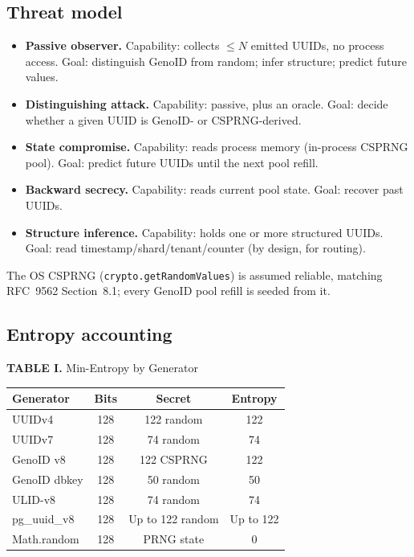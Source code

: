 \documentclass[conference]{IEEEtran}
\begin{document}
\subsection{Threat model}
\begin{itemize}
    \item \textbf{Passive observer.} Capability: collects $\leq N$ emitted UUIDs, no process access. Goal: distinguish GenoID from random; infer structure; predict future values.
    
    \item \textbf{Distinguishing attack.} Capability: passive, plus an oracle. Goal: decide whether a given UUID is GenoID- or CSPRNG-derived.
    
    \item \textbf{State compromise.} Capability: reads process memory (in-process CSPRNG pool). Goal: predict future UUIDs until the next pool refill.
    
    \item \textbf{Backward secrecy.} Capability: reads current pool state. Goal: recover past UUIDs.
    
    \item \textbf{Structure inference.} Capability: holds one or more structured UUIDs. Goal: read timestamp/shard/tenant/counter (by design, for routing).
\end{itemize}

The OS CSPRNG (\texttt{crypto.getRandomValues}) is assumed reliable, matching RFC~9562 Section~8.1; every GenoID pool refill is seeded from it.

\subsection{Entropy accounting}

\begin{center}
\footnotesize

\textbf{TABLE I.} Min-Entropy by Generator

\vspace{0.4em}

\begin{tabular*}{\columnwidth}{@{\extracolsep{\fill}}lccc}
\hline
\textbf{Generator} & \textbf{Bits} & \textbf{Secret} & \textbf{Entropy} \\
\hline
UUIDv4 & 128 & 122 random & 122 \\
UUIDv7 & 128 & 74 random & 74 \\
GenoID v8 & 128 & 122 CSPRNG & 122 \\
GenoID dbkey & 128 & 50 random & 50 \\
ULID-v8 & 128 & 74 random & 74 \\
pg\_uuid\_v8 & 128 & Up to 122 random & Up to 122 \\
Math.random & 128 & PRNG state & 0 \\
\hline
\end{tabular*}
\end{center}
\end{document}
